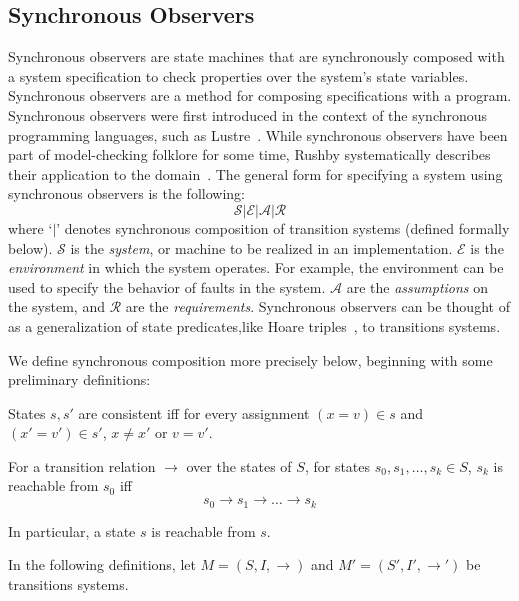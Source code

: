\documentclass{llncs/llncs}
\newcommand{\lee}[1]{ } %
\newcommand{\lee}[1]{ {\color{blue}$<$lee: #1$>$} } %
\begin{document}
\lee{note that we don't need full generality of send and receive events in OM(1)}

\subsection{Synchronous Observers}\label{sec:sync}
Synchronous observers are state machines that are synchronously composed with a system specification to check properties over the system's state variables. Synchronous observers are a method for composing specifications with a program. Synchronous observers were first introduced in the context of the synchronous programming languages, such as Lustre~\cite{}. While synchronous observers have been part of model-checking folklore for some time, Rushby systematically describes their application to the domain~\cite{}. The general form for specifying a system using synchronous observers is the following:
$$\mathcal{S} | \mathcal{E} | \mathcal{A} | \mathcal{R}$$
\noindent
where `$|$' denotes synchronous composition of transition systems (defined formally below). $\mathcal{S}$ is the \emph{system}, or machine to be realized in an implementation. $\mathcal{E}$ is the \emph{environment} in which the system operates. For example, the environment can be used to specify the behavior of faults in the system. $\mathcal{A}$ are the \emph{assumptions} on the system, and $\mathcal{R}$ are the \emph{requirements}. Synchronous observers can be thought of as a generalization of state predicates,like Hoare triples~\cite{}, to transitions systems.

We define synchronous composition more precisely below, beginning with some preliminary definitions:

\begin{definition}
  States $s, s'$ are consistent iff for every assignment $(x = v) \in s$ and $(x' =
  v') \in s'$, $x \neq x'$ or $v = v'$.
\end{definition}

\begin{definition}
For a transition relation $\rightarrow$ over the states of $S$, for states $s_0, s_1, \ldots, s_k \in S$, $s_k$ is reachable from $s_0$ iff
$$s_0 \rightarrow s_1 \rightarrow \ldots \rightarrow s_k$$
\end{definition}
\noindent
In particular, a state $s$ is reachable from $s$.

In the following definitions, let
$M = (S, I, \rightarrow)$
and
$M' = (S', I', \rightarrow')$
be transitions systems.
\end{document}

